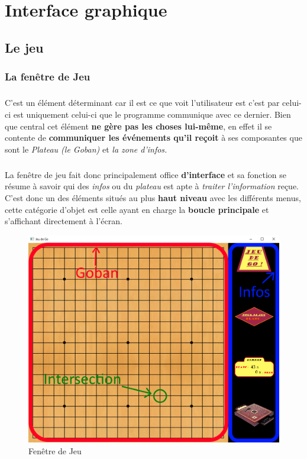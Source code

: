 \chapter{Interface graphique}\label{chap:GUI}
    \section{Le jeu}
        \subsection{La fenêtre de Jeu}
            \paragraph{}C'est un élément déterminant car il est ce que voit l'utilisateur est c'est par celui-ci est uniquement celui-ci que le programme communique avec ce dernier. Bien que central cet élément \textbf{ne gère pas les choses lui-même}, en effet il se contente de \textbf{communiquer les événements qu'il reçoit} à ses composantes que sont le \textit{Plateau (le Goban)} et \textit{la zone d'infos.}
            
            \paragraph{}La fenêtre de jeu fait donc principalement office \textbf{d'interface} et sa fonction se résume à savoir qui des \textit{infos} ou du \textit{plateau} est apte à \textit{traiter l'information} reçue. C'est donc un des éléments situés au plus \textbf{haut niveau} avec les différents menus, cette catégorie d'objet est celle ayant en charge la \textbf{boucle principale} et s'affichant directement à l'écran.
            
            \begin{figure}[h!]
            \centering
            \includegraphics[scale=0.45]{figures/experiments/Fenetre_de_jeu.png}
            \caption{Fenêtre de Jeu}
            \label{fig:game}
            \end{figure}
            
